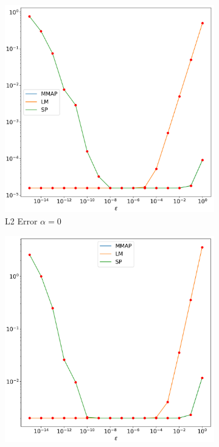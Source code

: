 \documentclass[12pt]{ociamthesis}
\begin{document}
\begin{figure}[H]
 \begin{subfigure}{0.42\textwidth}
     \includegraphics[width=\textwidth]{Pics/LHSims/E1a_MMAP_LM_SPL2.png}
     \caption{L2 Error $\alpha=0$}
 \end{subfigure}
   \begin{subfigure}{0.42\textwidth}
     \includegraphics[width=\textwidth]{Pics/LHSims/E1a_MMAP_LM_SPH1.png}

\end{subfigure}
\end{figure}
\end{document}
